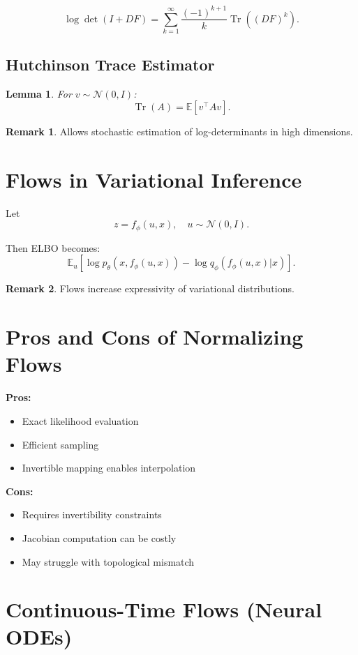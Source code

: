 \documentclass[12pt,oneside]{book}
\numberwithin{equation}{section}
\theoremstyle{definition}
\newtheorem{remark}{Remark}[section]
\theoremstyle{plain}
\newtheorem{lemma}{Lemma}[section]
\theoremstyle{remark}
\newcommand{\E}{\mathbb{E}}
\newcommand{\Normal}{\mathcal{N}}
\begin{document}
\[
\log \det (I + DF)
=
\sum_{k=1}^\infty \frac{(-1)^{k+1}}{k} \operatorname{Tr}((DF)^k).
\]

\subsection{Hutchinson Trace Estimator}

\begin{lemma}
For $v \sim \Normal(0,I)$:
\[
\operatorname{Tr}(A) = \E[v^\top A v].
\]
\end{lemma}

\begin{remark}
Allows stochastic estimation of log-determinants in high dimensions.
\end{remark}

\section{Flows in Variational Inference}

Let
\[
z = f_\phi(u,x), \quad u \sim \Normal(0,I).
\]

Then ELBO becomes:
\[
\E_{u} \left[
\log p_\theta(x, f_\phi(u,x)) - \log q_\phi(f_\phi(u,x)|x)
\right].
\]

\begin{remark}
Flows increase expressivity of variational distributions.
\end{remark}

\section{Pros and Cons of Normalizing Flows}

\textbf{Pros:}
\begin{itemize}
    \item Exact likelihood evaluation
    \item Efficient sampling
    \item Invertible mapping enables interpolation
\end{itemize}

\textbf{Cons:}
\begin{itemize}
    \item Requires invertibility constraints
    \item Jacobian computation can be costly
    \item May struggle with topological mismatch
\end{itemize}

\section{Continuous-Time Flows (Neural ODEs)}
\end{document}
